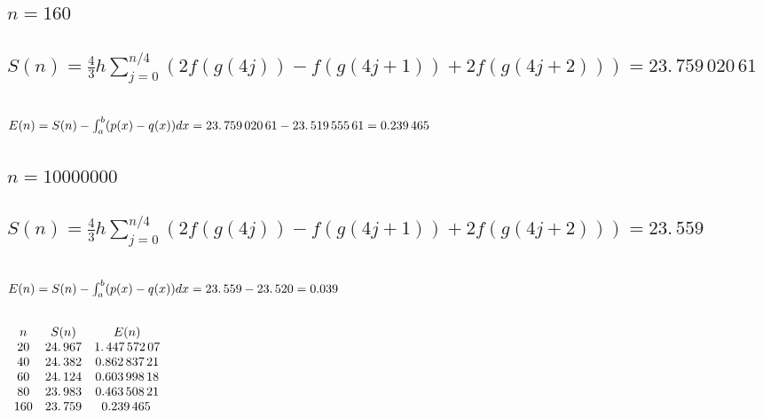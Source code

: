 \documentclass{article}
\begin{document}
\bigskip

\subsection{$n=160$}

\subsection{$S(n)=\frac{4}{3}h\sum%
\limits_{j=0}^{n/4}(2f(g(4j))-f(g(4j+1))+2f(g(4j+2)))=\allowbreak
23.\,\allowbreak 759\,020\,61$}

\subsection{$E(n)=S(n)-\protect\int_{a}^{b}(p(x)-q(x))dx\allowbreak
\allowbreak =\allowbreak 23.\,\allowbreak 759\,020\,61-23.\,\allowbreak
519\,555\,61=\allowbreak 0.239\,465\,$}

\bigskip

\subsection{$n=10000000$}

\subsection{$S(n)=\frac{4}{3}h\sum%
\limits_{j=0}^{n/4}(2f(g(4j))-f(g(4j+1))+2f(g(4j+2)))=\allowbreak
23.\,\allowbreak 559$}

\subsection{$E(n)=S(n)-\protect\int_{a}^{b}(p(x)-q(x))dx\allowbreak
\allowbreak =\allowbreak 23.\,\allowbreak 559-23.\,\allowbreak 520=0.039\,$}

\bigskip

\subsection{\protect\bigskip $%
\protect\begin{array}{ccc}
n & S(n) & E(n)\protect \\ 
20 & 24.\,\allowbreak 967 & 1.\,\allowbreak 447\,572\,07\protect \\ 
40 & 24.\,\allowbreak 382 & \allowbreak 0.862\,837\,21\protect \\ 
60 & 24.\,\allowbreak 124 & \allowbreak 0.603\,998\,18\protect \\ 
80 & 23.\,\allowbreak 983 & \allowbreak 0.463\,508\,21\protect \\ 
160 & 23.\,\allowbreak 759 & \allowbreak 0.239\,465\,%
\protect\end{array}%
$}
\end{document}
